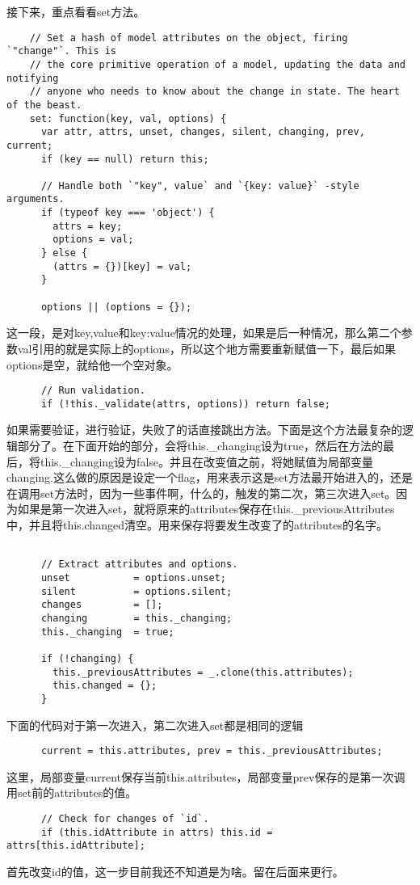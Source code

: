   接下来，重点看看set方法。
  \begin{lstlisting}
    // Set a hash of model attributes on the object, firing `"change"`. This is
    // the core primitive operation of a model, updating the data and notifying
    // anyone who needs to know about the change in state. The heart of the beast.
    set: function(key, val, options) {
      var attr, attrs, unset, changes, silent, changing, prev, current;
      if (key == null) return this;

      // Handle both `"key", value` and `{key: value}` -style arguments.
      if (typeof key === 'object') {
        attrs = key;
        options = val;
      } else {
        (attrs = {})[key] = val;
      }

      options || (options = {});
  \end{lstlisting}
  这一段，是对key,value和{key:value}情况的处理，如果是后一种情况，那么第二个参数val引用的就是实际上的options，所以这个地方需要重新赋值一下，最后如果options是空，就给他一个空对象。

  \begin{lstlisting}
      // Run validation.
      if (!this._validate(attrs, options)) return false;
  \end{lstlisting}

  如果需要验证，进行验证，失败了的话直接跳出方法。下面是这个方法最复杂的逻辑部分了。在下面开始的部分，会将this.\_changing设为true，然后在方法的最后，将this.\_changing设为false。并且在改变值之前，将她赋值为局部变量changing.这么做的原因是设定一个flag，用来表示这是set方法最开始进入的，还是在调用set方法时，因为一些事件啊，什么的，触发的第二次，第三次进入set。因为如果是第一次进入set，就将原来的attributes保存在this.\_previousAttributes中，并且将this.changed清空。用来保存将要发生改变了的attributes的名字。

  \begin{lstlisting}

      // Extract attributes and options.
      unset           = options.unset;
      silent          = options.silent;
      changes         = [];
      changing        = this._changing;
      this._changing  = true;

      if (!changing) {
        this._previousAttributes = _.clone(this.attributes);
        this.changed = {};
      }

  \end{lstlisting}
  下面的代码对于第一次进入，第二次进入set都是相同的逻辑
  \begin{lstlisting}
      current = this.attributes, prev = this._previousAttributes;

  \end{lstlisting}
  这里，局部变量current保存当前this.attributes，局部变量prev保存的是第一次调用set前的attributes的值。
  \begin{lstlisting}
      // Check for changes of `id`.
      if (this.idAttribute in attrs) this.id = attrs[this.idAttribute];
  \end{lstlisting}
  首先改变id的值，这一步目前我还不知道是为啥。留在后面来更行。

